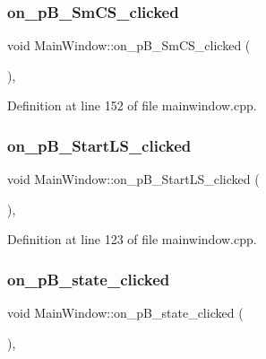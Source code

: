 \subsubsection{\texorpdfstring{on\+\_\+p\+B\+\_\+\+Sm\+C\+S\+\_\+clicked}{on\_pB\_SmCS\_clicked}}
{\footnotesize\ttfamily void Main\+Window\+::on\+\_\+p\+B\+\_\+\+Sm\+C\+S\+\_\+clicked (\begin{DoxyParamCaption}{ }\end{DoxyParamCaption})\hspace{0.3cm}{\ttfamily [private]}, {\ttfamily [slot]}}



Definition at line 152 of file mainwindow.\+cpp.

\mbox{\label{class_main_window_af5e65874a5cc4c9880134cc11279d7df}} 
\subsubsection{\texorpdfstring{on\+\_\+p\+B\+\_\+\+Start\+L\+S\+\_\+clicked}{on\_pB\_StartLS\_clicked}}
{\footnotesize\ttfamily void Main\+Window\+::on\+\_\+p\+B\+\_\+\+Start\+L\+S\+\_\+clicked (\begin{DoxyParamCaption}{ }\end{DoxyParamCaption})\hspace{0.3cm}{\ttfamily [private]}, {\ttfamily [slot]}}



Definition at line 123 of file mainwindow.\+cpp.

\mbox{\label{class_main_window_ac508398ff861dfde00e6e861cd492558}} 
\subsubsection{\texorpdfstring{on\+\_\+p\+B\+\_\+state\+\_\+clicked}{on\_pB\_state\_clicked}}
{\footnotesize\ttfamily void Main\+Window\+::on\+\_\+p\+B\+\_\+state\+\_\+clicked (\begin{DoxyParamCaption}{ }\end{DoxyParamCaption})\hspace{0.3cm}{\ttfamily [private]}, {\ttfamily [slot]}}



